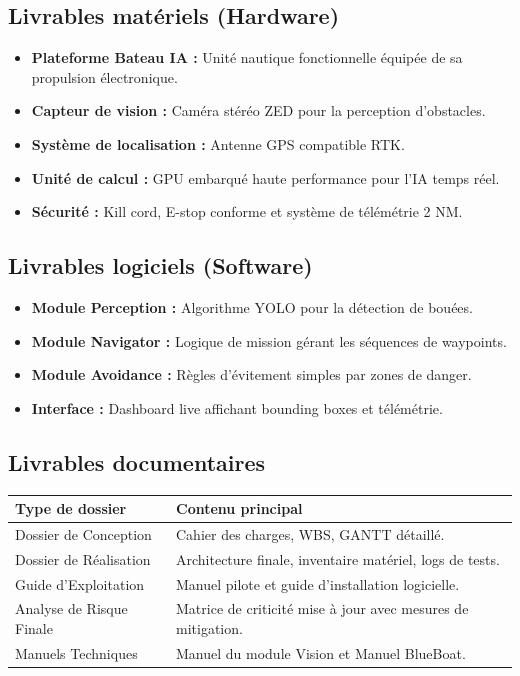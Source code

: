 \documentclass[11pt, a4paper]{article}
\begin{document}
\subsection{Livrables matériels (Hardware)}
\begin{itemize}
    \item \textbf{Plateforme Bateau IA :} Unité nautique fonctionnelle équipée de sa propulsion électronique.
    \item \textbf{Capteur de vision :} Caméra stéréo ZED pour la perception d'obstacles.
    \item \textbf{Système de localisation :} Antenne GPS compatible RTK.
    \item \textbf{Unité de calcul :} GPU embarqué haute performance pour l'IA temps réel.
    \item \textbf{Sécurité :} Kill cord, E-stop conforme et système de télémétrie 2 NM.
\end{itemize}

\subsection{Livrables logiciels (Software)}
\begin{itemize}
    \item \textbf{Module Perception :} Algorithme YOLO pour la détection de bouées.
    \item \textbf{Module Navigator :} Logique de mission gérant les séquences de waypoints.
    \item \textbf{Module Avoidance :} Règles d'évitement simples par zones de danger.
    \item \textbf{Interface :} Dashboard live affichant bounding boxes et télémétrie.
\end{itemize}

\subsection{Livrables documentaires}
\begin{tabularx}{\textwidth}{lX}
\toprule
\textbf{Type de dossier} & \textbf{Contenu principal} \\
\midrule
Dossier de Conception & Cahier des charges, WBS, GANTT détaillé. \\
Dossier de Réalisation & Architecture finale, inventaire matériel, logs de tests. \\
Guide d'Exploitation & Manuel pilote et guide d'installation logicielle. \\
Analyse de Risque Finale & Matrice de criticité mise à jour avec mesures de mitigation. \\
Manuels Techniques & Manuel du module Vision et Manuel BlueBoat. \\
\bottomrule
\end{tabularx}
\end{document}
